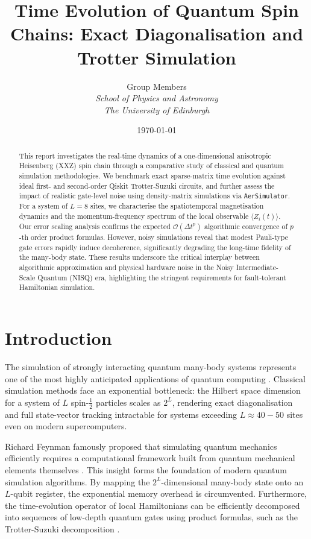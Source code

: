 \documentclass[11pt,a4paper]{article}
\title{\textbf{Time Evolution of Quantum Spin Chains: Exact Diagonalisation and Trotter Simulation}}
\author{
    Group Members \\
    \textit{School of Physics and Astronomy} \\
    \textit{The University of Edinburgh}
}
\date{\today}
\begin{document}
\maketitle

\begin{abstract}
This report investigates the real-time dynamics of a one-dimensional anisotropic Heisenberg (XXZ) spin chain through a comparative study of classical and quantum simulation methodologies. We benchmark exact sparse-matrix time evolution against ideal first- and second-order Qiskit Trotter-Suzuki circuits, and further assess the impact of realistic gate-level noise using density-matrix simulations via \texttt{AerSimulator}. For a system of $L = 8$ sites, we characterise the spatiotemporal magnetisation dynamics and the momentum-frequency spectrum of the local observable $\langle Z_i(t) \rangle$. Our error scaling analysis confirms the expected $\mathcal{O}(\Delta t^p)$ algorithmic convergence of $p$-th order product formulas. However, noisy simulations reveal that modest Pauli-type gate errors rapidly induce decoherence, significantly degrading the long-time fidelity of the many-body state. These results underscore the critical interplay between algorithmic approximation and physical hardware noise in the Noisy Intermediate-Scale Quantum (NISQ) era, highlighting the stringent requirements for fault-tolerant Hamiltonian simulation.
\end{abstract}

\newpage
\tableofcontents
\newpage

\section{Introduction} \label{sec:intro}

The simulation of strongly interacting quantum many-body systems represents one of the most highly anticipated applications of quantum computing \cite{Georgescu2014, Daley2022}. Classical simulation methods face an exponential bottleneck: the Hilbert space dimension for a system of $L$ spin-$\frac{1}{2}$ particles scales as $2^L$, rendering exact diagonalisation and full state-vector tracking intractable for systems exceeding $L \approx 40-50$ sites even on modern supercomputers.

Richard Feynman famously proposed that simulating quantum mechanics efficiently requires a computational framework built from quantum mechanical elements themselves \cite{Feynman1982}. This insight forms the foundation of modern quantum simulation algorithms. By mapping the $2^L$-dimensional many-body state onto an $L$-qubit register, the exponential memory overhead is circumvented. Furthermore, the time-evolution operator of local Hamiltonians can be efficiently decomposed into sequences of low-depth quantum gates using product formulas, such as the Trotter-Suzuki decomposition \cite{Lloyd1996}.
\end{document}
